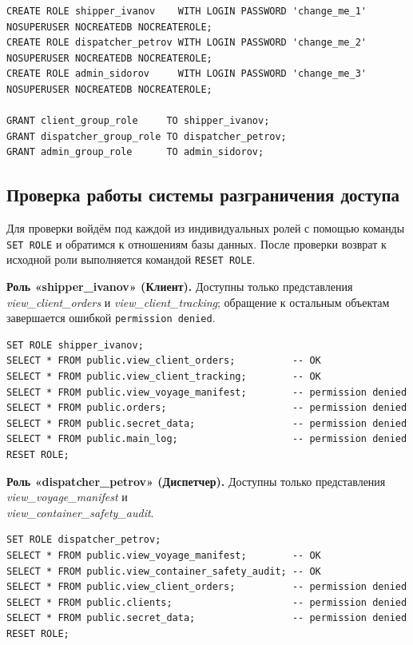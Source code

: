 \documentclass[a4paper,14pt]{article}
\begin{document}
\begin{lstlisting}
CREATE ROLE shipper_ivanov    WITH LOGIN PASSWORD 'change_me_1' NOSUPERUSER NOCREATEDB NOCREATEROLE;
CREATE ROLE dispatcher_petrov WITH LOGIN PASSWORD 'change_me_2' NOSUPERUSER NOCREATEDB NOCREATEROLE;
CREATE ROLE admin_sidorov     WITH LOGIN PASSWORD 'change_me_3' NOSUPERUSER NOCREATEDB NOCREATEROLE;

GRANT client_group_role     TO shipper_ivanov;
GRANT dispatcher_group_role TO dispatcher_petrov;
GRANT admin_group_role      TO admin_sidorov;
\end{lstlisting}

\subsection{Проверка работы системы разграничения доступа}
Для проверки войдём под каждой из индивидуальных ролей с помощью команды \texttt{SET ROLE} и обратимся к отношениям базы данных. После проверки возврат к исходной роли выполняется командой \texttt{RESET ROLE}.

\textbf{Роль «shipper\_ivanov» (Клиент).} Доступны только представления \textit{view\_client\_orders} и \textit{view\_client\_tracking}; обращение к остальным объектам завершается ошибкой \texttt{permission denied}.

\begin{lstlisting}
SET ROLE shipper_ivanov;
SELECT * FROM public.view_client_orders;          -- OK
SELECT * FROM public.view_client_tracking;        -- OK
SELECT * FROM public.view_voyage_manifest;        -- permission denied
SELECT * FROM public.orders;                      -- permission denied
SELECT * FROM public.secret_data;                 -- permission denied
SELECT * FROM public.main_log;                    -- permission denied
RESET ROLE;
\end{lstlisting}

\textbf{Роль «dispatcher\_petrov» (Диспетчер).} Доступны только представления \textit{view\_voyage\_manifest} и \\ \textit{view\_container\_safety\_audit}.

\begin{lstlisting}
SET ROLE dispatcher_petrov;
SELECT * FROM public.view_voyage_manifest;        -- OK
SELECT * FROM public.view_container_safety_audit; -- OK
SELECT * FROM public.view_client_orders;          -- permission denied
SELECT * FROM public.clients;                     -- permission denied
SELECT * FROM public.secret_data;                 -- permission denied
RESET ROLE;
\end{lstlisting}
\end{document}
